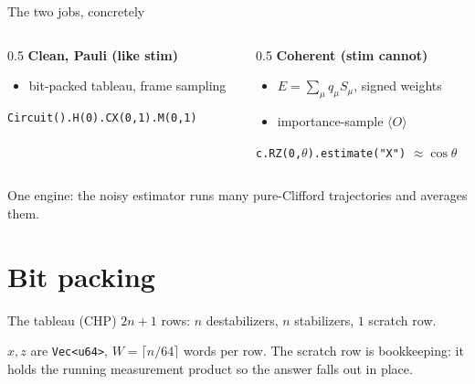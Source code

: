 \documentclass[aspectratio=169]{beamer}
\newcommand{\code}[1]{\texttt{#1}}
\begin{document}
\begin{frame}{The two jobs, concretely}
  \begin{columns}[T]
    \begin{column}{0.5\textwidth}
      \textbf{Clean, Pauli (like stim)}
      \begin{itemize}
        \item bit-packed tableau, frame sampling
      \end{itemize}
      \vspace{1mm}
      {\small\texttt{Circuit().H(0).CX(0,1).M(0,1)}}
    \end{column}
    \begin{column}{0.5\textwidth}
      \textbf{Coherent (stim cannot)}
      \begin{itemize}
        \item $E=\sum_\mu q_\mu S_\mu$, signed weights
        \item importance-sample $\langle O\rangle$
      \end{itemize}
      \vspace{1mm}
      {\small\texttt{c.RZ(0,$\theta$).estimate("X")} $\approx \cos\theta$}
    \end{column}
  \end{columns}
  \vfill
  \begin{center}\small One engine: the noisy estimator runs many pure-Clifford trajectories and averages them.\end{center}
\end{frame}

\section{Bit packing}

\begin{frame}{The tableau (CHP)}
  $2n+1$ rows: $n$ destabilizers, $n$ stabilizers, $1$ scratch row.
  \vfill
  \begin{center}
  \end{center}
  \vfill
  \begin{center}\small
    $x,z$ are \code{Vec<u64>}, $W=\lceil n/64\rceil$ words per row. The scratch row is bookkeeping: it holds the running
    measurement product so the answer falls out in place.
  \end{center}
\end{frame}
\end{document}
